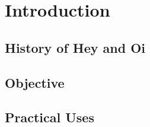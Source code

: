 \chapter{Introduction}

\setcounter{page}{13}

\section{History of Hey and Oi} 



\section{Objective}



\section{Practical Uses}


